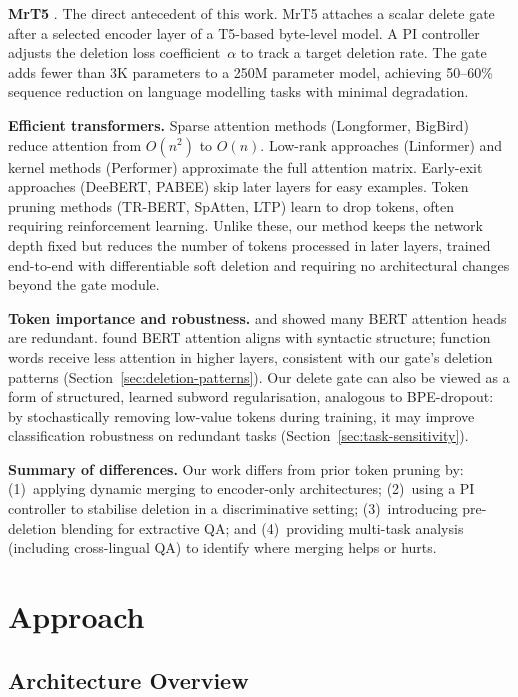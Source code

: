 \documentclass[11pt,a4paper]{article}
\begin{document}
\textbf{MrT5} \citep{kallini2024mrt5}. The direct antecedent of this work. MrT5 attaches a scalar delete gate after a selected encoder layer of a T5-based byte-level model. A PI controller adjusts the deletion loss coefficient~$\alpha$ to track a target deletion rate. The gate adds fewer than 3K parameters to a 250M parameter model, achieving 50--60\% sequence reduction on language modelling tasks with minimal degradation.

\textbf{Efficient transformers.} Sparse attention methods (Longformer, BigBird) reduce attention from $O(n^2)$ to $O(n)$. Low-rank approaches (Linformer) and kernel methods (Performer) approximate the full attention matrix. Early-exit approaches (DeeBERT, PABEE) skip later layers for easy examples. Token pruning methods (TR-BERT, SpAtten, LTP) learn to drop tokens, often requiring reinforcement learning. Unlike these, our method keeps the network depth fixed but reduces the number of tokens processed in later layers, trained end-to-end with differentiable soft deletion and requiring no architectural changes beyond the gate module.

\textbf{Token importance and robustness.} \citet{michel2019heads} and \citet{voita2019heads} showed many BERT attention heads are redundant. \citet{clark2019attention} found BERT attention aligns with syntactic structure; function words receive less attention in higher layers, consistent with our gate's deletion patterns (Section~\ref{sec:deletion-patterns}). Our delete gate can also be viewed as a form of structured, learned subword regularisation, analogous to BPE-dropout: by stochastically removing low-value tokens during training, it may improve classification robustness on redundant tasks (Section~\ref{sec:task-sensitivity}).

\textbf{Summary of differences.} Our work differs from prior token pruning by: (1)~applying dynamic merging to encoder-only architectures; (2)~using a PI controller to stabilise deletion in a discriminative setting; (3)~introducing pre-deletion blending for extractive QA; and (4)~providing multi-task analysis (including cross-lingual QA) to identify where merging helps or hurts.



\section{Approach}
\label{sec:approach}

\subsection{Architecture Overview}
\end{document}
